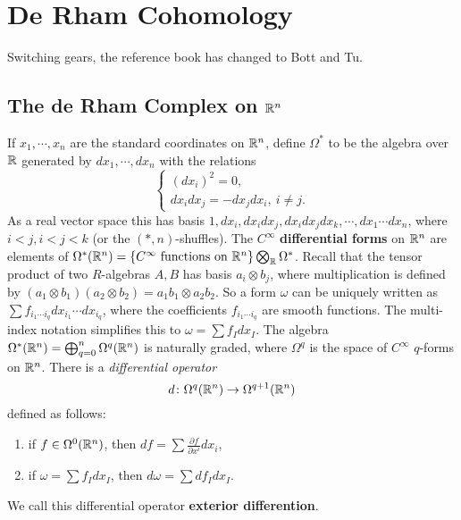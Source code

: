 \newcommand\Supp{\ensuremath{\operatorname{Supp}}} 
\section{De Rham Cohomology} 

Switching gears, the reference book has changed to Bott and Tu. 
\subsection{The de Rham Complex on $\mathbb{R}^n $}
   If $x_1,\cdots ,x_n $ are the standard coordinates on $\mathbb{R}^n $, define $\Omega^*$ to be the algebra over $\mathbb{R}$ generated by $dx_1,\cdots ,dx_n $ with the relations
   \[
   \begin{cases}
       (dx_i )^2=0,\\
       dx_i dx_j =-dx_j dx_i ,\ i\neq j.
   \end{cases}
   \] 
   As a real vector space this has basis $1, dx_i ,dx_i dx_j , dx_i dx_j dx_k,\cdots ,dx_1\cdots dx_n $, where $i<j,i<j<k$ (or the $(*,n)$-shuffles). The $C^{\infty}$ \textbf{differential forms} on $\mathbb{R}^n $ are elements of $\Omega^* (\mathbb{R}^n )= \{C^{\infty}\ \text{functions on} \ \mathbb{R}^n \} \bigotimes_{\mathbb{R}}\Omega^*$. Recall that the tensor product of two $R$-algebras $A,B$ has basis $a_i\otimes b_j $, where multiplication is defined by $(a_1\otimes b_1)(a_2\otimes b_2)=a_1b_1\otimes a_2b_2$. So a form $\omega$ can be uniquely written as $\sum f_{i_1\cdots i_q}dx_{i_1}\cdots dx_{i_q}$, where the coefficients $f_{i_1\cdots i_q}$ are smooth functions. The multi-index notation simplifies this to $\omega=\sum f_I dx_I$. The algebra $\Omega^*(\mathbb{R}^n )=\bigoplus _{q=0}^n \Omega^q(\mathbb{R}^n )$ is naturally graded, where $\Omega^q$ is the space of $C^{\infty}$ $q$-forms on $\mathbb{R}^n $. There is a \emph{differential operator} \[
       d \colon \Omega^q(\mathbb{R}^n ) \to \Omega^{q+1}(\mathbb{R}^n )
   \] defined as follows:
   \begin{enumerate}[label=(\roman*)]
   \setlength\itemsep{-.2em}
       \item if $f \in \Omega^0(\mathbb{R}^n )$, then $df=\sum \frac{\partial f}{\partial x^i }dx_i $,
        \item if $\omega=\sum f_I dx_I$, then $d\omega=\sum df_I dx_I$.
   \end{enumerate}We call this differential operator \textbf{exterior differention}.

